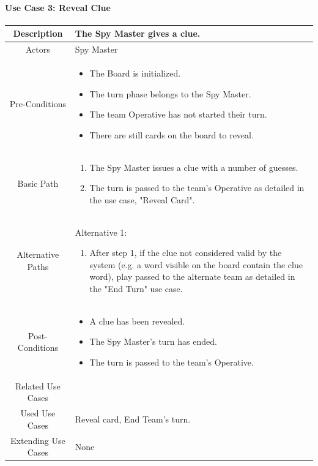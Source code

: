 \documentclass[10pt, a4paper]{article}
\begin{document}
	\paragraph{Use Case 3: Reveal Clue}
		\begin{center}
		\begin{tabular}{ |c|p{10cm}| } 
			\hline
			Description & The Spy Master gives a clue. \\ 
			\hline
			Actors & Spy Master \\
			\hline 
			Pre-Conditions & \begin{itemize}[noitemsep,topsep=0pt]
				\item The Board is initialized.
				\item The turn phase belongs to the Spy Master.
				\item The team Operative has not started their turn.
				\item There are still cards on the board to reveal.
			\end{itemize} \\
			\hline
			Basic Path & 
				\begin{enumerate}
					\item The Spy Master issues a clue with a number of guesses.
					\item The turn is passed to the team's Operative as detailed in the use case, "Reveal Card". 
				\end{enumerate} \\
			\hline 
			Alternative Paths & Alternative 1:
				\begin{enumerate}
					\item After step 1, if the clue not considered valid by the system (e.g. a word visible on the board contain the clue word), play passed to the alternate team as detailed in the "End Turn" use case.
				\end{enumerate}\\
			\hline 
			Post-Conditions & 
				\begin{itemize}[noitemsep,topsep=0pt]
					\item A clue has been revealed.
					\item The Spy Master's turn has ended.
					\item The turn is passed to the team's Operative.
				\end{itemize} \\
			\hline 
			Related Use Cases & \\
			\hline 
			Used Use Cases & Reveal card, End Team's turn. \\
			\hline
			Extending Use Cases & None \\
			\hline
		\end{tabular}
	\end{center}
\end{document}
